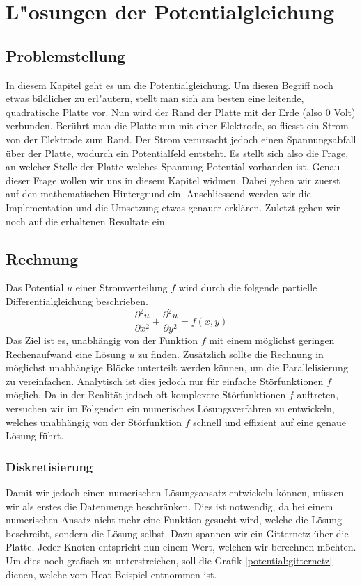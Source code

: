\chapter{L"osungen der Potentialgleichung}
\begin{refsection}

\section{Problemstellung}
In diesem Kapitel geht es um die Potentialgleichung. Um diesen Begriff
noch etwas bildlicher zu erl"autern, stellt man sich am besten eine
leitende, quadratische Platte vor. Nun wird der Rand der Platte mit der
Erde (also 0 Volt) verbunden. Ber\"uhrt man die Platte nun mit einer
Elektrode, so fliesst ein Strom von der Elektrode zum Rand. Der Strom
verursacht jedoch einen Spannungsabfall \"uber der Platte, wodurch
ein Potentialfeld entsteht. Es stellt sich also die Frage, an welcher
Stelle der Platte welches Spannung-Potential vorhanden ist. Genau dieser
Frage wollen wir uns in diesem Kapitel widmen. Dabei gehen wir zuerst
auf den mathematischen Hintergrund ein. Anschliessend werden wir die
Implementation und die Umsetzung etwas genauer erkl\"aren. Zuletzt gehen
wir noch auf die erhaltenen Resultate ein.

\section{Rechnung}
Das Potential $u$ einer Stromverteilung $f$ wird durch die folgende
partielle Differentialgleichung beschrieben.
\begin{equation}\label{eq:gleichung}
\dfrac{\partial^2 u}{\partial x^2}+\dfrac{\partial^2 u}{\partial y^2} =f(x,y)
\end{equation}
Das Ziel ist es, unabh\"angig von der Funktion $f$ mit einem m\"oglichst
geringen Rechenaufwand eine L\"osung $u$ zu finden. Zus\"atzlich sollte
die Rechnung in m\"oglichst unabh\"angige Bl\"ocke unterteilt werden
k\"onnen, um die Parallelisierung zu vereinfachen. Analytisch ist dies
jedoch nur f\"ur einfache St\"orfunktionen $f$ m\"oglich. Da in der
Realit\"at jedoch oft komplexere St\"orfunktionen $f$ auftreten, versuchen
wir im Folgenden ein numerisches L\"osungsverfahren zu entwickeln,
welches unabh\"angig von der St\"orfunktion $f$ schnell und effizient
auf eine genaue L\"osung f\"uhrt.


\subsection{Diskretisierung}
Damit wir jedoch einen numerischen L\"osungsansatz entwickeln k\"onnen,
m\"ussen wir als erstes die Datenmenge beschr\"anken. Dies ist notwendig,
da bei einem numerischen Ansatz nicht mehr eine Funktion gesucht wird,
welche die L\"osung beschreibt, sondern die L\"osung selbst. Dazu
spannen wir ein Gitternetz \"uber die Platte. Jeder Knoten entspricht
nun einem Wert, welchen wir berechnen m\"ochten. Um dies noch grafisch zu
unterstreichen, soll die Grafik \ref{potential:gitternetz} dienen,
welche vom Heat-Beispiel
entnommen ist. 


\end{refsection}

